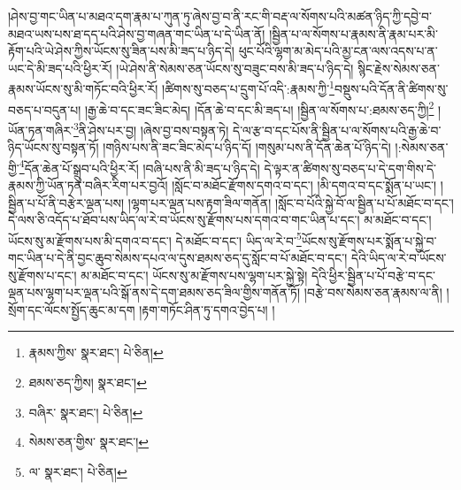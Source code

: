 །ཤེས་བྱ་གང་ཡིན་པ་མཐའ་དག་རྣམ་པ་ཀུན་ཏུ་ཞེས་བྱ་བ་ནི་རང་གི་བརྡ་ལ་སོགས་པའི་མཚན་ཉིད་ཀྱི་དབྱེ་བ་མཐའ་ཡས་པས་ཐ་དད་པའི་ཤེས་བྱ་གཞན་གང་ཡིན་པ་དེ་ཡིན་ནོ། །སྦྱིན་པ་ལ་སོགས་པ་རྣམས་ནི་རྣམ་པར་མི་རྟོག་པའི་ཡེ་ཤེས་ཀྱིས་ཡོངས་སུ་ཟིན་པས་མི་ཟད་པ་ཉིད་དེ། ཕུང་པོའི་ལྷག་མ་མེད་པའི་མྱ་ངན་ལས་འདས་པ་ན་ཡང་དེ་མི་ཟད་པའི་ཕྱིར་རོ། །ཡེ་ཤེས་ནི་སེམས་ཅན་ཡོངས་སུ་བཟུང་བས་མི་ཟད་པ་ཉིད་དེ། སྙིང་རྗེས་སེམས་ཅན་རྣམས་ཡོངས་སུ་མི་གཏོང་བའི་ཕྱིར་རོ། །ཚིགས་སུ་བཅད་པ་དྲུག་པོ་འདི་:རྣམས་ཀྱི་\footnote{རྣམས་ཀྱིས་  སྣར་ཐང་།  པེ་ཅིན། }བསྡུས་པའི་དོན་ནི་ཚིགས་སུ་བཅད་པ་བདུན་པ། །རྒྱ་ཆེ་བ་དང་ཟང་ཟིང་མེད། །དོན་ཆེ་བ་དང་མི་ཟད་པ། །སྦྱིན་ལ་སོགས་པ་:ཐམས་ཅད་ཀྱི།\footnote{ཐམས་ཅད་ཀྱིས།  སྣར་ཐང་། } །ཡོན་ཏན་གཞིར་\footnote{བཞིར་  སྣར་ཐང་།  པེ་ཅིན། }ནི་ཤེས་པར་བྱ། །ཞེས་བྱ་བས་བསྟན་ཏེ། དེ་ལ་རྩ་བ་དང་པོས་ནི་སྦྱིན་པ་ལ་སོགས་པའི་རྒྱ་ཆེ་བ་ཉིད་ཡོངས་སུ་བསྟན་ཏོ། །གཉིས་པས་ནི་ཟང་ཟིང་མེད་པ་ཉིད་དོ། །གསུམ་པས་ནི་དོན་ཆེན་པོ་ཉིད་དེ། །:སེམས་ཅན་གྱི་\footnote{སེམས་ཅན་གྱིས་  སྣར་ཐང་། }དོན་ཆེན་པོ་སྒྲུབ་པའི་ཕྱིར་རོ། །བཞི་པས་ནི་མི་ཟད་པ་ཉིད་དེ། དེ་ལྟར་ན་ཚིགས་སུ་བཅད་པ་དེ་དག་གིས་དེ་རྣམས་ཀྱི་ཡོན་ཏན་བཞིར་རིག་པར་བྱའོ། །སློང་བ་མཐོང་རྫོགས་དགའ་བ་དང་། །མི་དགའ་བ་དང་སྨོན་པ་ཡང་། །སྦྱིན་པ་པོ་ནི་བརྩེར་ལྡན་པས། །ལྷག་པར་ལྡན་པས་རྟག་ཟིལ་གནོན། །སློང་བ་པོའི་སྐྱེ་བོ་ལ་སྦྱིན་པ་པོ་མཐོང་བ་དང་། དེ་ལས་ཅི་འདོད་པ་ཐོབ་པས་ཡིད་ལ་རེ་བ་ཡོངས་སུ་རྫོགས་པས་དགའ་བ་གང་ཡིན་པ་དང་། མ་མཐོང་བ་དང་། ཡོངས་སུ་མ་རྫོགས་པས་མི་དགའ་བ་དང་། དེ་མཐོང་བ་དང་། ཡིད་ལ་རེ་བ་\footnote{ལ་  སྣར་ཐང་།  པེ་ཅིན། }ཡོངས་སུ་རྫོགས་པར་སྨོན་པ་སྐྱེ་བ་གང་ཡིན་པ་དེ་ནི་བྱང་ཆུབ་སེམས་དཔའ་ལ་དུས་ཐམས་ཅད་དུ་སློང་བ་པོ་མཐོང་བ་དང་། དེའི་ཡིད་ལ་རེ་བ་ཡོངས་སུ་རྫོགས་པ་དང་། མ་མཐོང་བ་དང་། ཡོངས་སུ་མ་རྫོགས་པས་ལྷག་པར་སྐྱེ་སྟེ། དེའི་ཕྱིར་སྦྱིན་པ་པོ་བརྩེ་བ་དང་ལྡན་པས་ལྷག་པར་ལྡན་པའི་སྒོ་ནས་དེ་དག་ཐམས་ཅད་ཟིལ་གྱིས་གནོན་ཏོ། །བརྩེ་བས་སེམས་ཅན་རྣམས་ལ་ནི། །སྲོག་དང་ལོངས་སྤྱོད་ཆུང་མ་དག །རྟག་གཏོང་ཤིན་ཏུ་དགའ་བྱེད་པ། །
